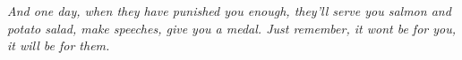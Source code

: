 \thispagestyle{empty}
\begin{flushright}
    \emph{And one day, when they have punished you enough, they'll serve you salmon and potato salad, make speeches, give you a medal. Just remember, it wont be for you, it will be for them.}
\end{flushright}
